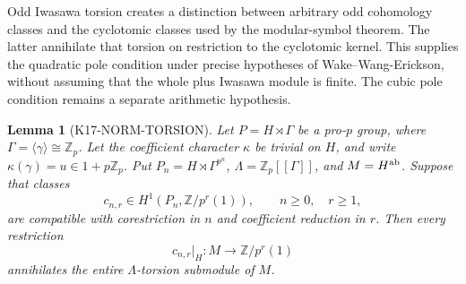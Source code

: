 \documentclass[11pt,a4paper]{article}
\newtheorem{lemma}[theorem]{Lemma}
\theoremstyle{definition}
\begin{document}
Odd Iwasawa torsion creates a distinction between arbitrary odd
cohomology classes and the cyclotomic classes used by the modular-symbol
theorem.  The latter annihilate that torsion on restriction to the
cyclotomic kernel.  This supplies the quadratic pole condition under
precise hypotheses of Wake--Wang-Erickson, without assuming that the
whole plus Iwasawa module is finite.  The cubic pole condition remains
a separate arithmetic hypothesis.

\begin{lemma}[K17-NORM-TORSION]\label{lem:norm-torsion}
Let \(P=H\rtimes\Gamma\) be a pro-\(p\) group, where
\(\Gamma=\langle\gamma\rangle\cong\mathbb Z_p\).  Let the coefficient
character \(\kappa\) be trivial on \(H\), and write
\(\kappa(\gamma)=u\in1+p\mathbb Z_p\).
Put \(P_n=H\rtimes\Gamma^{p^n}\),
\(\Lambda=\mathbb Z_p[[\Gamma]]\), and \(M=H^{\rm ab}\).
Suppose that classes
\[
 c_{n,r}\in H^1(P_n,\mathbb Z/p^r(1)),
 \qquad n\geq0,\quad r\geq1,
\]
are compatible with corestriction in \(n\) and coefficient reduction
in \(r\).  Then every restriction
\[
 c_{n,r}|_H:M\longrightarrow\mathbb Z/p^r(1)
\]
annihilates the entire \(\Lambda\)-torsion submodule of \(M\).
\end{lemma}
\end{document}

